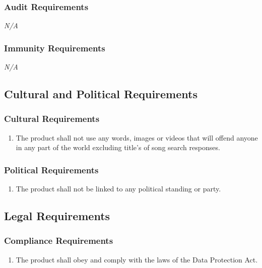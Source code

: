 \documentclass[]{article}
\newcounter{saveenum}
\newcommand{\pauseEnum}{\setcounter{saveenum}{\value{enumi}}}
\newcommand{\resumeEnum}{\setcounter{enumi}{\value{saveenum}}}
\newcommand{\NA}{\indent\indent\emph{N/A}}
\begin{document}
\subsubsection{Audit Requirements}
\label{ssub:audit_requirements}
	\NA

\subsubsection{Immunity Requirements}
\label{ssub:immunity_requirements}
	\NA


\subsection{Cultural and Political Requirements}
\label{sub:cultural_and_political_requirements}

\subsubsection{Cultural Requirements}
\label{ssub:cultural_requirements}
\begin{enumerate}[{CP}1. ]
	\item The product shall not use any words, images or videos that will offend anyone in any part of the world excluding title's of song search responses.
	\pauseEnum
\end{enumerate}

\subsubsection{Political Requirements}
\label{ssub:political_requirements}
\begin{enumerate}[{CP}1. ]
	\resumeEnum
	\item The product shall not be linked to any political standing or party.
	\pauseEnum
\end{enumerate}


\subsection{Legal Requirements}
\label{sub:legal_requirements}

\subsubsection{Compliance Requirements}
\label{ssub:compliance_requirements}
\begin{enumerate}[{LR}1. ]
	\item The product shall obey and comply with the laws of the Data Protection Act.
	\pauseEnum
\end{enumerate}
\end{document}
